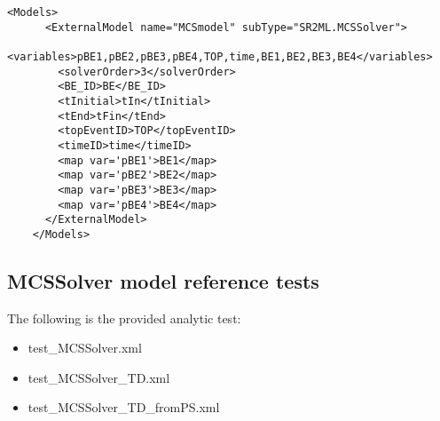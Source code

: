 \begin{itemize}
   \begin{lstlisting}[style=XML,morekeywords={anAttribute},caption=Time dependent (from PointSet) MCSSolver model input example., label=lst:MCSSolver_InputExample]
    <Models>
      <ExternalModel name="MCSmodel" subType="SR2ML.MCSSolver">
        <variables>pBE1,pBE2,pBE3,pBE4,TOP,time,BE1,BE2,BE3,BE4</variables>
        <solverOrder>3</solverOrder>
        <BE_ID>BE</BE_ID>
        <tInitial>tIn</tInitial>
        <tEnd>tFin</tEnd>
        <topEventID>TOP</topEventID>
        <timeID>time</timeID>
        <map var='pBE1'>BE1</map>
        <map var='pBE2'>BE2</map>
        <map var='pBE3'>BE3</map>
        <map var='pBE4'>BE4</map>
      </ExternalModel>
    </Models>
  \end{lstlisting}
\end{itemize}

\subsection{MCSSolver model reference tests}
The following is the provided analytic test:
\begin{itemize}
  \item test\_MCSSolver.xml
  \item test\_MCSSolver\_TD.xml
  \item test\_MCSSolver\_TD\_fromPS.xml
\end{itemize}




